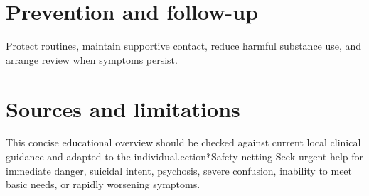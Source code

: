\section*{Prevention and follow-up}
Protect routines, maintain supportive contact, reduce harmful substance use, and arrange review when symptoms persist.

\section*{Sources and limitations}
This concise educational overview should be checked against current local clinical guidance and adapted to the individual.ection*{Safety-netting}
Seek urgent help for immediate danger, suicidal intent, psychosis, severe confusion, inability to meet basic needs, or rapidly worsening symptoms.
